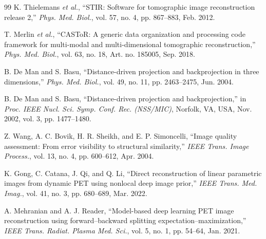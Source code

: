 \documentclass[11pt, a4paper]{article}
\begin{document}
\begin{thebibliography}{99}
 K. Thielemans \textit{et al.}, ``STIR: Software for tomographic image reconstruction release 2,'' \textit{Phys. Med. Biol.}, vol. 57, no. 4, pp. 867--883, Feb. 2012.

 T. Merlin \textit{et al.}, ``CASToR: A generic data organization and processing code framework for multi-modal and multi-dimensional tomographic reconstruction,'' \textit{Phys. Med. Biol.}, vol. 63, no. 18, Art. no. 185005, Sep. 2018.

 B. De Man and S. Basu, ``Distance-driven projection and backprojection in three dimensions,'' \textit{Phys. Med. Biol.}, vol. 49, no. 11, pp. 2463--2475, Jun. 2004.

 B. De Man and S. Basu, ``Distance-driven projection and backprojection,'' in \textit{Proc. IEEE Nucl. Sci. Symp. Conf. Rec. (NSS/MIC)}, Norfolk, VA, USA, Nov. 2002, vol. 3, pp. 1477--1480.

 Z. Wang, A. C. Bovik, H. R. Sheikh, and E. P. Simoncelli, ``Image quality assessment: From error visibility to structural similarity,'' \textit{IEEE Trans. Image Process.}, vol. 13, no. 4, pp. 600--612, Apr. 2004.

 K. Gong, C. Catana, J. Qi, and Q. Li, ``Direct reconstruction of linear parametric images from dynamic PET using nonlocal deep image prior,'' \textit{IEEE Trans. Med. Imag.}, vol. 41, no. 3, pp. 680--689, Mar. 2022.

 A. Mehranian and A. J. Reader, ``Model-based deep learning PET image reconstruction using forward--backward splitting expectation--maximization,'' \textit{IEEE Trans. Radiat. Plasma Med. Sci.}, vol. 5, no. 1, pp. 54--64, Jan. 2021.

\end{thebibliography}
\end{document}
